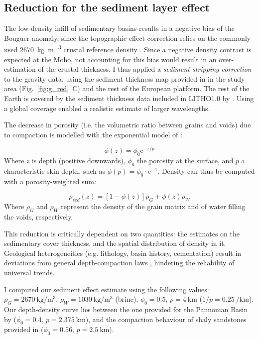 \subsection{Reduction for the sediment layer effect}
\label{ss:Appl:GravSed}
The low-density infill of sedimentary basins results in a negative bias of the Bouguer anomaly, since the topographic effect correction relies on the commonly used 2670~\si{\kilo \gram \per \cubic \metre} crustal reference density \parencite{Hinze2003}.
Since a negative density contrast is expected at the Moho, not accounting for this bias would result in an over-estimation of the crustal thickness.
I thus applied a \textit{sediment stripping correction} \parencite{Chen2014} to the gravity data, using the sediment thickness map provided in \textcite{Tesauro2008} in the study area (Fig.~\ref{fig:g_red}~C) and the rest of the European platform.
The rest of the Earth is covered by the sediment thickness data included in {LITHO1.0} by \textcite{Pasyanos2014}.
Using a global coverage enabled a realistic estimate of larger wavelengths.

The decrease in porosity (i.e. the volumetric ratio between grains and voids) due to compaction is modelled with the exponential model of \textcite{woodside1961}:

\begin{equation}
	\label{eq:ExpCompactionPhi}
	\phi(z) = \phi_0 \mathrm{e}^{-z/p}
\end{equation}
Where $z$ is depth (positive downwards), $\phi_0$ the porosity at the surface, and $p$ a characteristic skin-depth, such as $\phi(p) = \phi_0 \cdot \mathrm{e}^{-1}$.
Density can thus be computed with a porosity-weighted sum:

\begin{equation}
	\label{eq:ExpCompactionRho}
	\rho_{sed}(z) = [1-\phi(z)] \rho_{G} + \phi(z) \rho_{W}
\end{equation}
Where $\rho_{G}$ and $\rho_{W}$ represent the density of the grain matrix and of water filling the voids, respectively.

This reduction is critically dependent on two quantities: the estimates on the sedimentary cover thickness, and the spatial distribution of density in it.
Geological heterogeneities (e.g. lithology, basin history, cementation) result in deviations from general depth-compaction laws \parencite{allen2013basin}, hindering the reliability of universal trends.

I computed our sediment effect estimate using the following values: $\rho_G = \SI{2670}{\kilo \gram \per \cubic \metre}$, $\rho_W = \SI{1030}{\kilo \gram \per \cubic \metre}$ (brine), $\phi_0 = \num{0.5}$, $p = \SI{4}{\kilo \metre}$ ($1/p = \SI{0.25}{\per \kilo \metre}$).
Our depth-density curve lies between the one provided for the Pannonian Basin by \textcite{Kaban2010} ($\phi_0 = \num{0.4}$, $p = \SI{2.375}{\kilo \metre}$), and the compaction behaviour of shaly sandstones provided in \parencite{allen2013basin} ($\phi_0 = \num{0.56}$, $p = \SI{2.5}{\kilo \metre}$).

